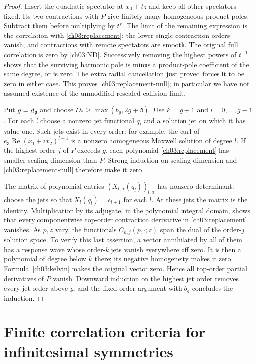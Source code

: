 \begin{proof}
Insert the quadratic spectator at $x_0+tz$ and keep all other spectators
fixed. Its two contractions with $P$ give finitely many homogeneous
product poles. Subtract them before multiplying by $t^r$.
The limit of the remaining expression is the correlation with
\eqref{ch03:replacement}: the lower single-contraction orders vanish,
and contractions with remote spectators are smooth. The original full
correlation is zero by \eqref{ch03:ND}. Successively removing the
highest powers of $t^{-1}$ shows that the surviving harmonic pole is
minus a product-pole coefficient of the same degree, or is zero.
The extra radial cancellation just proved forces it to be zero in
either case. This proves \eqref{ch03:replacement-null}; in particular
we have not assumed existence of the unmodified rescaled collision limit.

Put $g=d_{\mathfrak g}$ and choose
$D_*\ge\max(b_g,2g+5)$. Use $k=g+1$ and $l=0,\ldots,g-1$.
For each $l$ choose a nonzero jet functional $q_l$ and a solution jet on which it
has value one. Such jets exist in every order: for example, the curl of
$e_3\operatorname{Re}(x_1+ix_2)^{l+1}$ is a nonzero homogeneous
Maxwell solution of degree $l$. If the highest order $j$ of $P$ exceeds
$g$, each polynomial \eqref{ch03:replacement} has smaller scaling dimension than
$P$. Strong induction on scaling dimension and \eqref{ch03:replacement-null}
therefore make it zero.

The matrix of polynomial entries $(X_{l,\alpha}(q_l))_{l,\alpha}$
has nonzero determinant: choose the jets so that $X_l(q_l)=e_{l+1}$
for each $l$. At these jets the matrix is the identity. Multiplication
by its adjugate, in the polynomial integral domain, shows that every
componentwise top-order contraction derivative in
\eqref{ch03:replacement} vanishes. As $p,z$ vary, the functionals
$C_{k,j}(p,\cdot;z)$ span the dual of the order-$j$ solution space.
To verify this last assertion, a vector annihilated by all of them has
a response wave whose order-$k$ jets vanish everywhere off zero.
It is then a polynomial of degree below $k$ there; its negative
homogeneity makes it zero. Formula~\eqref{ch03:kelvin} makes the
original vector zero. Hence all top-order partial derivatives of $P$
vanish. Downward induction on the highest jet order removes every jet order above $g$, and the fixed-order
argument with $b_g$ concludes the induction.
\end{proof}

\section{Finite correlation criteria for infinitesimal symmetries}\label{ch03:finite-ward}

